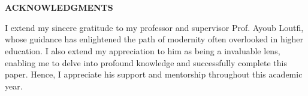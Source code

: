 \newenvironment{acknowledgments}
{%
    \thispagestyle{empty}%
    \vspace*{\stretch{2}}%
    \centering
    \justifying      %
}
{\par %
    \vspace{\stretch{3}} %
    \clearpage           %
}

\section*{}
\begin{acknowledgments}
    \begin{center}
        {\textbf{ACKNOWLEDGMENTS}}
    \end{center}
    I extend my sincere gratitude to my professor and supervisor Prof. Ayoub Loutfi,
    whose guidance has enlightened the path of modernity often overlooked in higher education.
    I also extend my appreciation to him as being a invaluable lens, enabling me to delve into
    profound knowledge and successfully complete this paper. Hence, I appreciate his support and mentorship
    throughout this academic year.
\end{acknowledgments}

